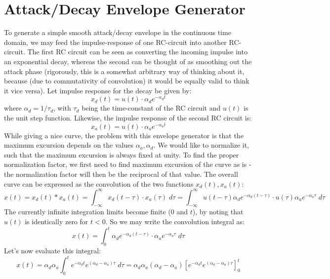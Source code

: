 \section{Attack/Decay Envelope Generator}
To generate a simple smooth attack/decay envelope in the continuous time domain, we may feed the impulse-response of one RC-circuit into another RC-circuit. The first RC circuit can be seen as converting the incoming impulse into an exponential decay, whereas the second can be thought of as smoothing out the attack phase (rigorously, this is a somewhat arbitrary way of thinking about it, because (due to commutativity of convolution) it would be equally valid to think it vice versa). Let impulse response for the decay be given by:
\begin{equation}
 x_d(t) = u(t) \cdot \alpha_d e^{ -\alpha_d t }
\end{equation}
where $\alpha_d = 1/\tau_d$, with $\tau_d$ being the time-constant of the RC circuit and $u(t)$ is the unit step function. Likewise, the impulse response of the second RC circuit is:
\begin{equation}
 x_a(t) = u(t) \cdot \alpha_a e^{ -\alpha_a t }
\end{equation}
While giving a nice curve, the problem with this envelope generator is that the maximum excursion depends on the values $\alpha_a, \alpha_d$. We would like to normalize it, such that the maximum excursion is always fixed at unity. To find the proper normalization factor, we first need to find maximum excursion of the curve as is - the normalization factor will then be the reciprocal of that value. The overall curve can be expressed as the convolution of the two functions $x_d(t), x_a(t)$:
\begin{equation}
 x(t) = x_d(t) * x_a(t) = \int_{-\infty}^{\infty} x_d (t-\tau) \cdot x_a (\tau) \; d \tau
      = \int_{-\infty}^{\infty} u(t-\tau) \alpha_d e^{ -\alpha_d (t-\tau) } \cdot u(\tau) \alpha_a e^{ -\alpha_a \tau } \; d \tau
\end{equation}
The currently infinite integration limits become finite ($0$ and $t$), by noting that $u(t)$ is identically zero for $t<0$. So we may write the convolution integral as:
\begin{equation}
 x(t) = \int_0^t \alpha_d e^{ -\alpha_d (t-\tau) } \cdot \alpha_a e^{ -\alpha_a \tau } \; d \tau
\end{equation}
Let's now evaluate this integral:
\begin{equation}
 x(t) = \alpha_d \alpha_a \int_0^t e^{-\alpha_d t}  e^{(\alpha_d-\alpha_a) \tau} \; d \tau
      = \alpha_d \alpha_a   (\alpha_d-\alpha_a) \left[ e^{-\alpha_d t}  e^{(\alpha_d-\alpha_a) \tau} \right]_0^t
\end{equation}
